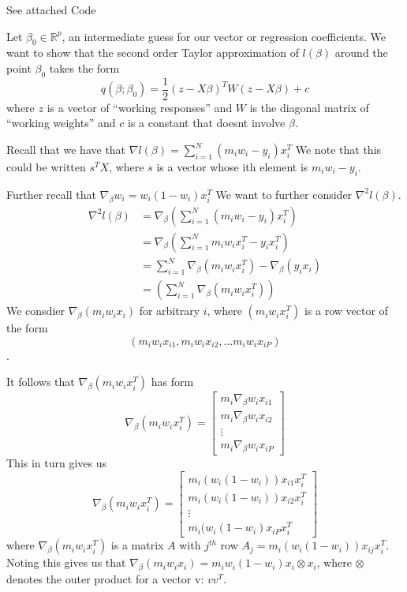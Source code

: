 \documentclass[12pt]{article}
\newcommand{\R}{\mathbb{R}}
\newenvironment{problem}[2][Exercise]{\begin{trivlist}
\item[\hskip \labelsep {\bfseries #1}\hskip \labelsep {\bfseries #2.}]}{\end{trivlist}}
\begin{document}
\begin{problem}{B}
See attached Code
\end{problem}

\begin{problem}{C}
Let $\beta_0 \in \R^p$, an intermediate guess for our vector or regression coefficients.
We want to show that the second order Taylor approximation of $l(\beta)$ around the point $\beta_0$ takes the form
$$q(\beta;\beta_0) = \frac{1}{2}(z - X\beta)^TW(z-X\beta) + c$$
where $z$ is a vector of ``working responses'' and $W$ is the diagonal matrix of ``working weights'' and $c$ is a constant that doesnt involve $\beta$.

Recall that we have that $\nabla l(\beta) = \sum_{i=1}^N(m_iw_i - y_i)x_i^T$
We note that this could be written $s^TX$, where $s$ is a vector whose ith element is $m_iw_i - y_i$.

Further recall that $\nabla_\beta w_i = w_i(1-w_i)x_i^T$
We want to further consider $\nabla^2 l(\beta)$.
\begin{align*}
\nabla^2 l(\beta) &= \nabla_\beta \left( \sum_{i=1}^N(m_iw_i - y_i)x_i^T \right)\\
&= \nabla_\beta \left( \sum_{i=1}^Nm_iw_ix_i^T - y_ix_i^T \right)\\
&=  \sum_{i=1}^N\nabla_\beta(m_iw_ix_i^T) - \nabla_\beta(y_ix_i)\\
&= \left(\sum_{i=1}^N \nabla_\beta(m_iw_ix_i^T)\right)
\end{align*}
We consdier $\nabla_\beta(m_iw_ix_i)$ for arbitrary $i$, where $(m_iw_ix_i^T)$ is a row vector of the form $$(m_iw_ix_{i1}, m_iw_ix_{i2}, \ldots m_iw_ix_{iP})$$.

It follows that $\nabla_\beta(m_iw_ix_i^T)$ has form
$$\nabla_\beta(m_iw_ix_i^T) = \left[\begin{array}{c} m_i \nabla_\beta w_i x_{i1} \\ m_i \nabla_\beta w_i x_{i2} \\ \vdots \\ m_i \nabla_\beta w_i x_{iP} \end{array}\right]$$
This in turn gives us
$$\nabla_\beta(m_iw_ix_i^T) = \left[\begin{array}{c} m_i (w_i(1-w_i)) x_{i1}x_i^T \\ m_i  (w_i(1-w_i)) x_{i2}x_i^T \\ \vdots \\ m_i (w_i(1-w_i) x_{iP}x_i^T \end{array}\right]$$
where $\nabla_\beta(m_iw_ix_i^T)$ is a matrix $A$ with $j^{th}$ row $A_j = m_i (w_i(1-w_i)) x_{ij}x_i^T$.
Noting this gives us that $\nabla_\beta(m_iw_ix_i) = m_iw_i(1-w_i)x_i \otimes x_i$, where $\otimes$ denotes the outer product for a vector v: $vv^T$.\


\end{problem}
\end{document}

